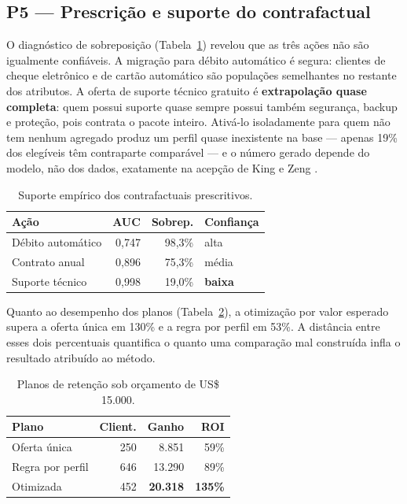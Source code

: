 \documentclass[10pt,a4paper]{article}
\begin{document}
\subsection{P5 --- Prescrição e suporte do contrafactual}

O diagnóstico de sobreposição (Tabela~\ref{tab:suporte}) revelou que as três ações não são
igualmente confiáveis. A migração para débito automático é segura: clientes de cheque eletrônico
e de cartão automático são populações semelhantes no restante dos atributos. A oferta de suporte
técnico gratuito é \textbf{extrapolação quase completa}: quem possui suporte quase sempre possui
também segurança, backup e proteção, pois contrata o pacote inteiro. Ativá-lo isoladamente para
quem não tem nenhum agregado produz um perfil quase inexistente na base --- apenas 19\% dos
elegíveis têm contraparte comparável --- e o número gerado depende do modelo, não dos dados,
exatamente na acepção de King e Zeng \cite{king}.

\begin{table}[t]
\centering
\small
\caption{Suporte empírico dos contrafactuais prescritivos.}
\label{tab:suporte}
\begin{tabular}{@{}lrrl@{}}
\toprule
\textbf{Ação} & \textbf{AUC} & \textbf{Sobrep.} & \textbf{Confiança} \\
\midrule
Débito automático & 0,747 & 98,3\% & alta \\
Contrato anual    & 0,896 & 75,3\% & média \\
Suporte técnico   & 0,998 & 19,0\% & \textbf{baixa} \\
\bottomrule
\end{tabular}
\end{table}

Quanto ao desempenho dos planos (Tabela~\ref{tab:prescricao}), a otimização por valor
esperado supera a oferta única em 130\% e a regra por perfil em 53\%. A distância entre
esses dois percentuais quantifica o quanto uma comparação mal construída infla o
resultado atribuído ao método.

\begin{table}[t]
\centering
\small
\caption{Planos de retenção sob orçamento de US\$ 15.000.}
\label{tab:prescricao}
\begin{tabular}{@{}lrrr@{}}
\toprule
\textbf{Plano} & \textbf{Client.} & \textbf{Ganho} & \textbf{ROI} \\
\midrule
Oferta única      & 250 & 8.851  & 59\%  \\
Regra por perfil  & 646 & 13.290 & 89\%  \\
Otimizada         & 452 & \textbf{20.318} & \textbf{135\%} \\
\bottomrule
\end{tabular}
\end{table}
\end{document}

